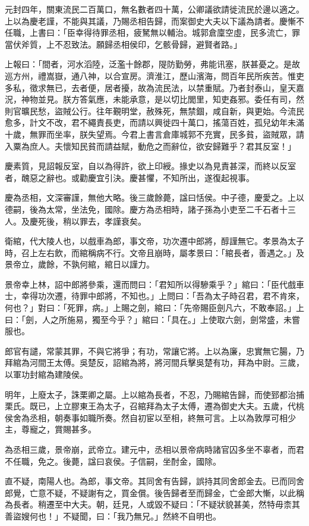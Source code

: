 \begin{pinyinscope}
元封四年，關東流民二百萬口，無名數者四十萬，公卿議欲請徙流民於邊以適之。上以為慶老謹，不能與其議，乃賜丞相告歸，而案御史大夫以下議為請者。慶慚不任職，上書曰：「臣幸得待罪丞相，疲駑無以輔治。城郭倉廩空虛，民多流亡，罪當伏斧質，上不忍致法。願歸丞相侯印，乞骸骨歸，避賢者路。」

上報曰：「間者，河水滔陸，泛濫十餘郡，隄防勤勞，弗能讯塞，朕甚憂之。是故巡方州，禮嵩嶽，通八神，以合宣房。濟淮江，歷山濱海，問百年民所疾苦。惟吏多私，徵求無已，去者便，居者擾，故為流民法，以禁重賦。乃者封泰山，皇天嘉況，神物並見。朕方答氣應，未能承意，是以切比閭里，知吏姦邪。委任有司，然則官曠民愁，盜賊公行。往年覲明堂，赦殊死，無禁錮，咸自新，與更始。今流民愈多，計文不改，君不繩責長吏，而請以興徙四十萬口，搖蕩百姓，孤兒幼年未滿十歲，無罪而坐率，朕失望焉。今君上書言倉庫城郭不充實，民多貧，盜賊眾，請入粟為庶人。夫懷知民貧而請益賦，動危之而辭位，欲安歸難乎？君其反室！」

慶素質，見詔報反室，自以為得許，欲上印綬。掾史以為見責甚深，而終以反室者，醜惡之辭也。或勸慶宜引決。慶甚懼，不知所出，遂復起視事。

慶為丞相，文深審謹，無他大略。後三歲餘薨，諡曰恬侯。中子德，慶愛之。上以德嗣，後為太常，坐法免，國除。慶方為丞相時，諸子孫為小吏至二千石者十三人。及慶死後，稍以罪去，孝謹衰矣。

衛綰，代大陵人也，以戲車為郎，事文帝，功次遷中郎將，醇謹無它。孝景為太子時，召上左右飲，而綰稱病不行。文帝且崩時，屬孝景曰：「綰長者，善遇之。」及景帝立，歲餘，不孰何綰，綰日以謹力。

景帝幸上林，詔中郎將參乘，還而問曰：「君知所以得驂乘乎？」綰曰：「臣代戲車士，幸得功次遷，待罪中郎將，不知也。」上問曰：「吾為太子時召君，君不肯來，何也？」對曰：「死罪，病。」上賜之劍，綰曰：「先帝賜臣劍凡六，不敢奉詔。」上曰：「劍，人之所施易，獨至今乎？」綰曰：「具在。」上使取六劍，劍常盛，未嘗服也。

郎官有譴，常蒙其罪，不與它將爭；有功，常讓它將。上以為廉，忠實無它腸，乃拜綰為河間王太傅。吳楚反，詔綰為將，將河間兵擊吳楚有功，拜為中尉。三歲，以軍功封綰為建陵侯。

明年，上廢太子，誅栗卿之屬。上以綰為長者，不忍，乃賜綰告歸，而使郅都治捕栗氏。既已，上立膠東王為太子，召綰拜為太子太傅，遷為御史大夫。五歲，代桃侯舍為丞相，朝奏事如職所奏。然自初宦以至相，終無可言。上以為敦厚可相少主，尊寵之，賞賜甚多。

為丞相三歲，景帝崩，武帝立。建元中，丞相以景帝病時諸官囚多坐不辜者，而君不任職，免之。後薨，諡曰哀侯。子信嗣，坐酎金，國除。

直不疑，南陽人也。為郎，事文帝。其同舍有告歸，誤持其同舍郎金去。已而同舍郎覺，亡意不疑，不疑謝有之，買金償。後告歸者至而歸金，亡金郎大慚，以此稱為長者。稍遷至中大夫。朝，廷見，人或毀不疑曰：「不疑狀貌甚美，然特毋柰其善盜嫂何也！」不疑聞，曰：「我乃無兄。」然終不自明也。


\end{pinyinscope}
